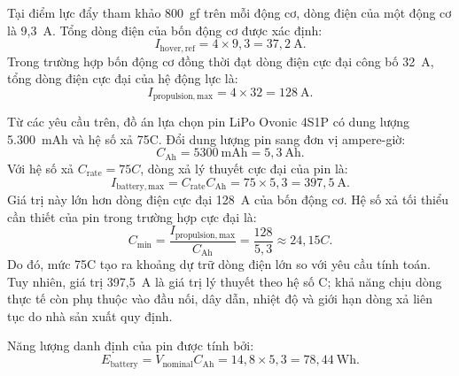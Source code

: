 Tại điểm lực đẩy tham khảo 800~gf trên mỗi động cơ, dòng điện của một động cơ là 9,3~A. Tổng dòng điện của bốn động cơ được xác định:
\begin{equation}
  I_{\mathrm{hover,ref}}=4\times9{,}3=37{,}2~\mathrm{A}.
\end{equation}
Trong trường hợp bốn động cơ đồng thời đạt dòng điện cực đại công bố 32~A, tổng dòng điện cực đại của hệ động lực là:
\begin{equation}
  I_{\mathrm{propulsion,max}}=4\times32=128~\mathrm{A}.
\end{equation}

Từ các yêu cầu trên, đồ án lựa chọn pin LiPo Ovonic 4S1P có dung lượng 5.300~mAh và hệ số xả 75C. Đổi dung lượng pin sang đơn vị ampere-giờ:
\begin{equation}
  C_{\mathrm{Ah}}=5300~\mathrm{mAh}=5{,}3~\mathrm{Ah}.
\end{equation}
Với hệ số xả $C_{\mathrm{rate}}=75C$, dòng xả lý thuyết cực đại của pin là:
\begin{equation}
  I_{\mathrm{battery,max}}
  =C_{\mathrm{rate}}C_{\mathrm{Ah}}
  =75\times5{,}3
  =397{,}5~\mathrm{A}.
\end{equation}
Giá trị này lớn hơn dòng điện cực đại 128~A của bốn động cơ. Hệ số xả tối thiểu cần thiết của pin trong trường hợp cực đại là:
\begin{equation}
  C_{\mathrm{min}}
  =\frac{I_{\mathrm{propulsion,max}}}{C_{\mathrm{Ah}}}
  =\frac{128}{5{,}3}
  \approx24{,}15C.
\end{equation}
Do đó, mức 75C tạo ra khoảng dự trữ dòng điện lớn so với yêu cầu tính toán. Tuy nhiên, giá trị 397,5~A là giá trị lý thuyết theo hệ số C; khả năng chịu dòng thực tế còn phụ thuộc vào đầu nối, dây dẫn, nhiệt độ và giới hạn dòng xả liên tục do nhà sản xuất quy định.

Năng lượng danh định của pin được tính bởi:
\begin{equation}
  E_{\mathrm{battery}}
  =V_{\mathrm{nominal}}C_{\mathrm{Ah}}
  =14{,}8\times5{,}3
  =78{,}44~\mathrm{Wh}.
\end{equation}

